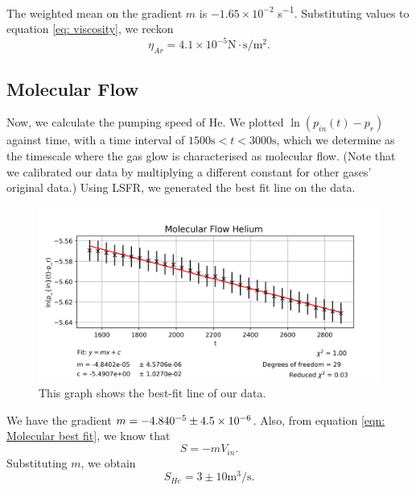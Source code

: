 \documentclass[12pt,a4paper]{article}
\begin{document}
	The weighted mean on the gradient $m$ is $-1.65 \times 10^{-2}$ \si{\second^{-1}}. Substituting values to equation \ref{eq: viscosity}, we reckon
	\begin{equation*}
		\eta_{Ar}= 4.1 \times 10^{-5}  \si{\newton\cdot\second\per\metre^2}.
	\end{equation*}
	
	\subsection{Molecular Flow}
	Now, we calculate the pumping speed of He. We plotted $\ln(p_{in}(t)-p_r)$ against time, with a time interval of $1500\si{\second}<t<3000\si{\second}$, which we determine as the timescale where the gas glow is characterised as molecular flow.	 (Note that we calibrated our data by multiplying a different constant for other gases' original data.) Using LSFR, we generated the best fit line on the data.
	\begin{figure}[h!]
		\begin{center}
			\includegraphics[scale=0.5]{Molecular_Helium_best_fit_line.png}
		\caption{This graph shows the best-fit line of our data.}
		\end{center}
			\end{figure}
 	
 	We have the gradient $m=-4.840 \time 10^{-5} \pm 4.5 \times 10^{-6}$. Also, from equation \ref{eqn: Molecular best fit}, we know that\\
 	\begin{equation}
 		S=-m V_{in}.
  	\end{equation}
  	Substituting $m$, we obtain\\ 
  	\begin{equation}
  		S_{He}= 3 \pm 10 \si{\meter^3\per\second}.
  	\end{equation}
  	
\end{document}
